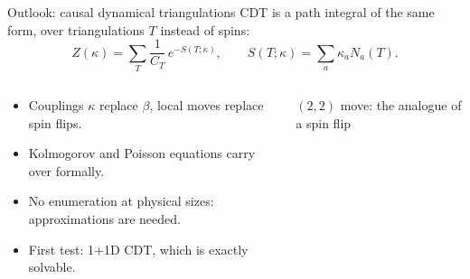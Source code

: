 \documentclass[aspectratio=169]{beamer}
\def\b{\begin{equation}}
\def\e{\end{equation}}
\begin{document}
\begin{frame}{Outlook: causal dynamical triangulations}
  CDT is a path integral of the same form, over triangulations $T$ instead of spins:
  \b
    Z(\kappa) = \sum_{T}\frac{1}{C_T}\,e^{-S(T;\kappa)},
    \qquad S(T;\kappa) = \sum_a \kappa_a N_a(T) .
  \e
  \begin{columns}[c]
    \begin{column}{0.66\textwidth}
      \begin{itemize}
        \item Couplings $\kappa$ replace $\beta$, local moves replace spin flips.
        \item Kolmogorov and Poisson equations carry over formally.
        \item No enumeration at physical sizes: approximations are needed.
        \item First test: 1+1D CDT, which is exactly solvable.
      \end{itemize}
    \end{column}
    \begin{column}{0.32\textwidth}
      \centering

      \vspace{0.2em}
      \scriptsize $(2,2)$ move: the analogue of a spin flip
    \end{column}
  \end{columns}
\end{frame}
\end{document}
